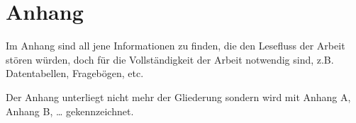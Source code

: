 \newpage
{}
\chapter*{Anhang}

Im Anhang sind all jene Informationen zu finden, die den Lesefluss der Arbeit stören würden, doch für die Vollständigkeit der Arbeit notwendig sind, z.B. Datentabellen, Fragebögen, etc.

\noindent Der Anhang unterliegt nicht mehr der Gliederung sondern wird mit Anhang A, Anhang B, … gekennzeichnet.
